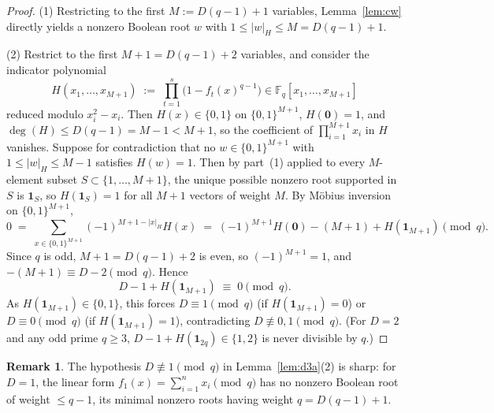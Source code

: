 \documentclass[11pt,a4paper]{article}
\theoremstyle{definition}
\newtheorem{remark}[theorem]{Remark}
\newcommand{\F}{\mathbb{F}}
\begin{document}
\begin{proof}
(1) Restricting to the first $M := D(q - 1) + 1$ variables, Lemma~\ref{lem:cw} directly yields a nonzero Boolean root $w$ with $1 \le |w|_H \le M = D(q - 1) + 1$.

(2) Restrict to the first $M + 1 = D(q - 1) + 2$ variables, and consider the indicator polynomial
\[
  H(x_1,\dots,x_{M+1}) \;:=\; \prod_{t=1}^s \bigl(1 - f_t(x)^{q-1}\bigr) \in \F_q[x_1,\dots,x_{M+1}]
\]
reduced modulo $x_i^2 - x_i$. Then $H(x) \in \{0, 1\}$ on $\{0, 1\}^{M+1}$, $H(\mathbf{0}) = 1$, and $\deg(H) \le D(q - 1) = M - 1 < M + 1$, so the coefficient of $\prod_{i=1}^{M+1} x_i$ in $H$ vanishes. Suppose for contradiction that no $w \in \{0,1\}^{M+1}$ with $1 \le |w|_H \le M - 1$ satisfies $H(w) = 1$. Then by part~(1) applied to every $M$-element subset $S \subset \{1,\dots,M+1\}$, the unique possible nonzero root supported in $S$ is $\mathbf{1}_S$, so $H(\mathbf{1}_S) = 1$ for all $M + 1$ vectors of weight $M$. By M{\"o}bius inversion on $\{0,1\}^{M+1}$,
\[
  0 \;=\; \sum_{x \in \{0,1\}^{M+1}} (-1)^{M + 1 - |x|_H} H(x)
    \;=\; (-1)^{M+1} H(\mathbf{0}) - (M + 1) + H(\mathbf{1}_{M+1}) \pmod q.
\]
Since $q$ is odd, $M + 1 = D(q - 1) + 2$ is even, so $(-1)^{M+1} = 1$, and $-(M + 1) \equiv D - 2 \pmod q$. Hence
\[
  D - 1 + H(\mathbf{1}_{M+1}) \;\equiv\; 0 \pmod q.
\]
As $H(\mathbf{1}_{M+1}) \in \{0, 1\}$, this forces $D \equiv 1 \pmod q$ (if $H(\mathbf{1}_{M+1}) = 0$) or $D \equiv 0 \pmod q$ (if $H(\mathbf{1}_{M+1}) = 1$), contradicting $D \not\equiv 0, 1 \pmod q$. (For $D = 2$ and any odd prime $q \ge 3$, $D - 1 + H(\mathbf{1}_{2q}) \in \{1, 2\}$ is never divisible by $q$.)
\end{proof}

\begin{remark}
The hypothesis $D \not\equiv 1 \pmod q$ in Lemma~\ref{lem:d3a}(2) is sharp: for $D = 1$, the linear form $f_1(x) = \sum_{i=1}^n x_i \pmod q$ has no nonzero Boolean root of weight $\le q - 1$, its minimal nonzero roots having weight $q = D(q - 1) + 1$.
\end{remark}
\end{document}
